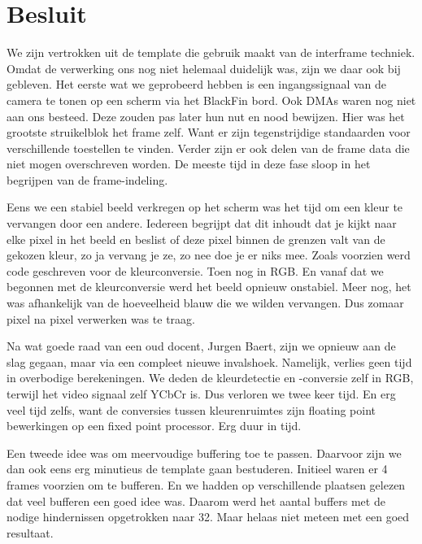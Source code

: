 \chapter{Besluit}
\par We zijn vertrokken uit de template die gebruik maakt van de interframe techniek. Omdat de verwerking ons nog niet helemaal duidelijk was, zijn we daar ook bij gebleven. Het eerste wat we geprobeerd hebben is een ingangssignaal van de camera te tonen op een scherm via het BlackFin bord. Ook DMAs waren nog niet aan ons besteed. Deze zouden pas later hun nut en nood bewijzen. Hier was het grootste struikelblok het frame zelf. Want er zijn tegenstrijdige standaarden voor verschillende toestellen te vinden. Verder zijn er ook delen van de frame data die niet mogen overschreven worden. De meeste tijd in deze fase sloop in het begrijpen van de frame-indeling.

\par Eens we een stabiel beeld verkregen op het scherm was het tijd om een kleur te vervangen door een andere. Iedereen begrijpt dat dit inhoudt dat je kijkt naar elke pixel in het beeld en beslist of deze pixel binnen de grenzen valt van de gekozen kleur, zo ja vervang je ze, zo nee doe je er niks mee. Zoals voorzien werd code geschreven voor de kleurconversie. Toen nog in RGB. En vanaf dat we begonnen met de kleurconversie werd het beeld opnieuw onstabiel. Meer nog, het was afhankelijk van de hoeveelheid blauw die we wilden vervangen. Dus zomaar pixel na pixel verwerken was te traag.

\par Na wat goede raad van een oud docent, Jurgen Baert, zijn we opnieuw aan de slag gegaan, maar via een compleet nieuwe invalshoek. Namelijk, verlies geen tijd in overbodige berekeningen. We deden de kleurdetectie en -conversie zelf in RGB, terwijl het video signaal zelf YCbCr is. Dus verloren we twee keer tijd. En erg veel tijd zelfs, want de conversies tussen kleurenruimtes zijn floating point bewerkingen op een fixed point processor. Erg duur in tijd.

\par Een tweede idee was om meervoudige buffering toe te passen. Daarvoor zijn we dan ook eens erg minutieus de template gaan bestuderen. Initieel waren er 4 frames voorzien om te bufferen. En we hadden op verschillende plaatsen gelezen dat veel bufferen een goed idee was. Daarom werd het aantal buffers met de nodige hindernissen opgetrokken naar 32. Maar helaas niet meteen met een goed resultaat.

